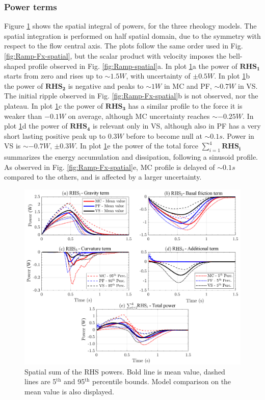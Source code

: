 \documentclass{article}
\begin{document}
\subsubsection{Power terms}
Figure \ref{fig:Ramp-Power-spatial} shows the spatial integral of powers, for the three rheology models. The spatial integration is performed on half spatial domain, due to the symmetry with respect to the flow central axis. The plots follow the same order used in Fig. \ref{fig:Ramp-Fx-spatial}, but the scalar product with velocity imposes the bell-shaped profile observed in Fig. \ref{fig:Ramp-spatial}a. In plot \ref{fig:Ramp-Power-spatial}a the power of $\boldsymbol{RHS_1}$ starts from zero and rises up to $\sim 1.5 W$, with uncertainty of $\pm 0.5 W$. In plot \ref{fig:Ramp-Power-spatial}b the power of  $\boldsymbol{RHS_2}$ is negative and peaks to $\sim 1 W$ in MC and PF, $\sim 0.7 W$ in VS. The initial ripple observed in Fig. \ref{fig:Ramp-Fx-spatial}b is not observed, nor the plateau. In plot \ref{fig:Ramp-Power-spatial}c the power of $\boldsymbol{RHS_3}$ has a similar profile to the force it is weaker than $-0.1 W$ on average, although MC uncertainty reaches $\sim -0.25 W$. In plot \ref{fig:Ramp-Power-spatial}d the power of $\boldsymbol{RHS_4}$ is relevant only in VS, although also in PF has a very short lasting positive peak up to $0.3 W$ before to become null at $\sim 0.1 s$. Power in VS is  $\sim -0.7 W$, $\pm 0.3 W$. In plot \ref{fig:Ramp-Power-spatial}e the power of the total force $\sum^4_{i=1}\boldsymbol{RHS_i}$ summarizes the energy accumulation and dissipation, following a sinusoid profile. As observed in Fig. \ref{fig:Ramp-Fx-spatial}e, MC profile is delayed of $\sim 0.1 s$ compared to the others, and is affected by a larger uncertainty.
\begin{figure}[H]
        \centering
        \includegraphics[width=1\textwidth]{InclinedPlane/AveragedMeasurments/PowersIncline.png}
        \caption{Spatial sum of the RHS powers. Bold line is mean value, dashed lines are 5$^{\mathrm{th}}$ and 95$^{\mathrm{th}}$ percentile bounds. Model comparison on the mean value is also displayed.}
        \label{fig:Ramp-Power-spatial}
\end{figure}
\end{document}
